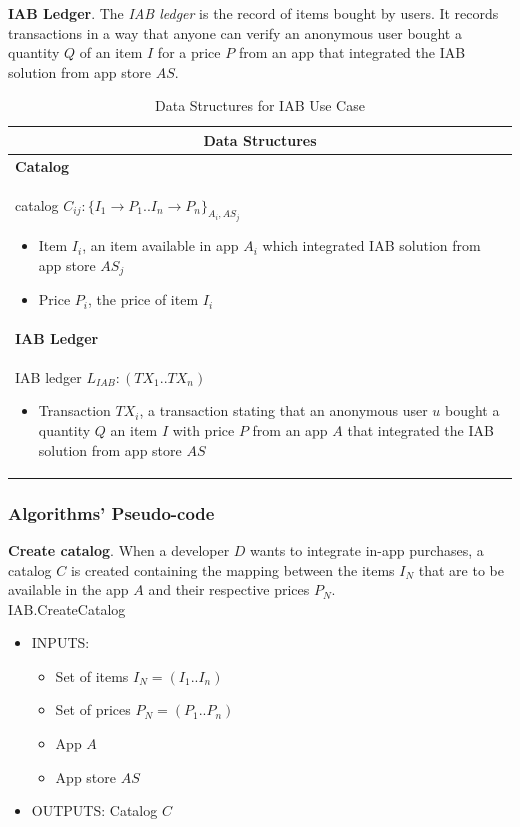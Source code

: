 \noindent \textbf{IAB Ledger}. The \textit{IAB ledger} is the record of items bought by users. It records transactions in a way that anyone can verify an anonymous user bought a quantity $Q$ of an item $I$ for a price $P$ from an app that integrated the IAB solution from app store $AS$.
\begin{table}[H]
\footnotesize
\centering
\begin{tabular}{|p{}|}
\hline
\multicolumn{1}{|c|}{Data Structures} \\
\hline \vspace{0.05cm}
\textbf{Catalog} \\
catalog $C_{ij} : \{I_1 \to P_1..I_n \to P_n\}_{A_i, AS_j}$
\begin{itemize}
	\item Item $I_i$, an item available in app $A_i$ which integrated IAB solution from app store $AS_j$
	\item Price $P_i$, the price of item $I_i$
\end{itemize} \\
\textbf{IAB Ledger} \\
IAB ledger $L_{IAB} : (TX_1..TX_n)$
\begin{itemize}
	\item Transaction $TX_i$, a transaction stating that an anonymous user $u$ bought a quantity $Q$ an item $I$ with price $P$ from an app $A$ that integrated the IAB solution from app store $AS$
\end{itemize} \\
\hline
\end{tabular}
\caption{Data Structures for IAB Use Case}
\label{table: data_structures_iab}
\end{table}


\subsubsection{Algorithms' Pseudo-code}


\noindent \textbf{Create catalog}. When a developer $D$ wants to integrate in-app purchases, a catalog $C$ is created containing the mapping between the items $I_N$ that are to be available in the app $A$ and their respective prices $P_N$. \\

\textsf{IAB.CreateCatalog}
\begin{itemize}
	\item INPUTS:
	\begin{itemize}
		\item Set of items $I_N = (I_1..I_n)$
		\item Set of prices $P_N = (P_1..P_n)$
		\item App $A$
		\item App store $AS$
	\end{itemize}
	\item OUTPUTS: Catalog $C$
\end{itemize}

